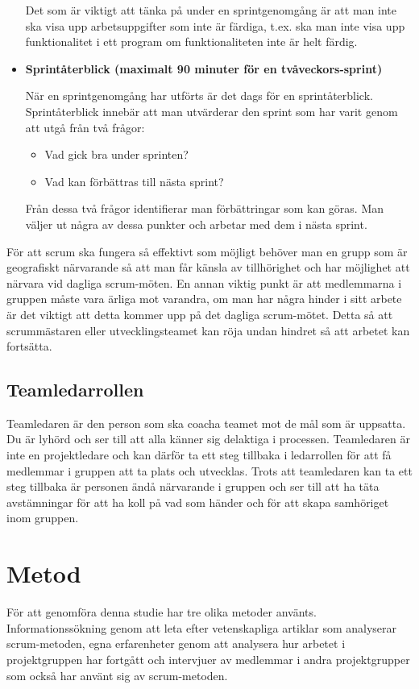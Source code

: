 \begin{itemize}
Det som är viktigt att tänka på under en sprintgenomgång är att man inte ska visa upp arbetsuppgifter som inte är färdiga, t.ex. ska man inte visa upp funktionalitet i ett program om funktionaliteten inte är helt färdig.

\item \textbf{Sprintåterblick (maximalt 90 minuter för en tvåveckors-sprint)}

När en sprintgenomgång har utförts är det dags för en sprintåterblick. Sprintåterblick innebär att man utvärderar den sprint som har varit genom att utgå från två frågor:

\begin{itemize}
	\item Vad gick bra under sprinten?
	\item Vad kan förbättras till nästa sprint?
\end{itemize}

Från dessa två frågor identifierar man förbättringar som kan göras. Man väljer ut några av dessa punkter och arbetar med dem i nästa sprint.

\end{itemize}

För att scrum ska fungera så effektivt som möjligt behöver man en grupp som är geografiskt närvarande så att man får känsla av tillhörighet och har möjlighet att närvara vid dagliga scrum-möten. En annan viktig punkt är att medlemmarna i gruppen måste vara ärliga mot varandra, om man har några hinder i sitt arbete är det viktigt att detta kommer upp på det dagliga scrum-mötet. Detta så att scrummästaren eller utvecklingsteamet kan röja undan hindret så att arbetet kan fortsätta.\cite{scrum}

\subsection{Teamledarrollen}
Teamledaren är den person som ska coacha teamet mot de mål som är uppsatta. Du är lyhörd och ser till att alla känner sig delaktiga i processen. Teamledaren är inte en projektledare och kan därför ta ett steg tillbaka i ledarrollen för att få medlemmar i gruppen att ta plats och utvecklas.\cite{teamledare} Trots att teamledaren kan ta ett steg tillbaka är personen ändå närvarande i gruppen och ser till att ha täta avstämningar för att ha koll på vad som händer och för att skapa samhöriget inom gruppen.\cite{teamguide}

\section{Metod}
För att genomföra denna studie har tre olika metoder använts. Informationssökning genom att leta efter vetenskapliga artiklar som analyserar scrum-metoden, egna erfarenheter genom att analysera hur arbetet i projektgruppen har fortgått och intervjuer av medlemmar i andra projektgrupper som också har använt sig av scrum-metoden.


